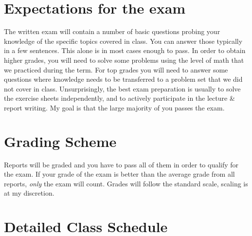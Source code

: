 \documentclass[letterpaper]{inzane_syllabus} %
\begin{document}
\section{Expectations for the exam}

The written exam will contain a number of basic questions probing your knowledge of the specific topics covered in class. You can answer those typically in a few sentences. This alone is in most cases enough to pass. In order to obtain higher grades, you will need to solve some problems using the level of math that we practiced during the term. For top grades you will need to answer some questions where knowledge needs to be transferred to a problem set that we did not cover in class. Unsurprisingly, the best exam preparation is usually to solve the exercise sheets independently, and to actively participate in the lecture \& report writing. My goal is that the large majority of you passes the exam.

\section{Grading Scheme}

\begin{twentyshort}
\end{twentyshort}

Reports will be graded and you have to pass all of them in order to qualify for the exam. If your  grade of the exam is better than the average grade from all reports, \textit{only} the exam will count. Grades will follow the standard scale, scaling is at my discretion.



\newpage
\makeFullPage
\section{Detailed Class Schedule}
\end{document}
